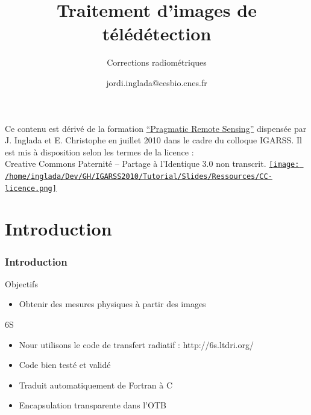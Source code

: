\documentclass[compress]{beamer}
\title{Traitement d'images de télédétection}
\subtitle{Corrections radiométriques}
\author
{jordi.inglada@cesbio.cnes.fr}
\institute[Cesbio] %
{\textsc{Centre d'Études Spatiales de la Biosphère, Toulouse, France}}
\date{}
\begin{document}
\begin{frame}
  \titlepage
  \begin{center}
{\tiny Ce contenu est dérivé de la formation \href{http://www.orfeo-toolbox.org/packages/PragmaticRemoteSensing-handout.pdf}{``Pragmatic Remote
  Sensing''} dispensée par J. Inglada et E. Christophe en juillet 2010
  dans le cadre du colloque IGARSS. Il est mis à disposition selon les termes de la licence :\\
Creative Commons Paternité – Partage à l’Identique 3.0 non transcrit.} \href{http://creativecommons.org/licenses/by-sa/3.0/}{\texttt{[image: /home/inglada/Dev/GH/IGARSS2010/Tutorial/Slides/Ressources/CC-licence.png]}}    
  \end{center}
\end{frame}

\section*{Introduction}

\begin{frame}

  \frametitle{Introduction}
  \begin{block}{Objectifs}
   \begin{itemize}
   \item Obtenir des mesures physiques à partir des images
   \end{itemize}
  \end{block}
  \begin{block}{6S}
   \begin{itemize}
    \item Nour utilisons le code de transfert radiatif : http://6s.ltdri.org/
    \item Code bien testé et validé
    \item Traduit automatiquement de Fortran à C
    \item Encapsulation transparente dans l'OTB
   \end{itemize}
  \end{block}

\end{frame}
\end{document}
